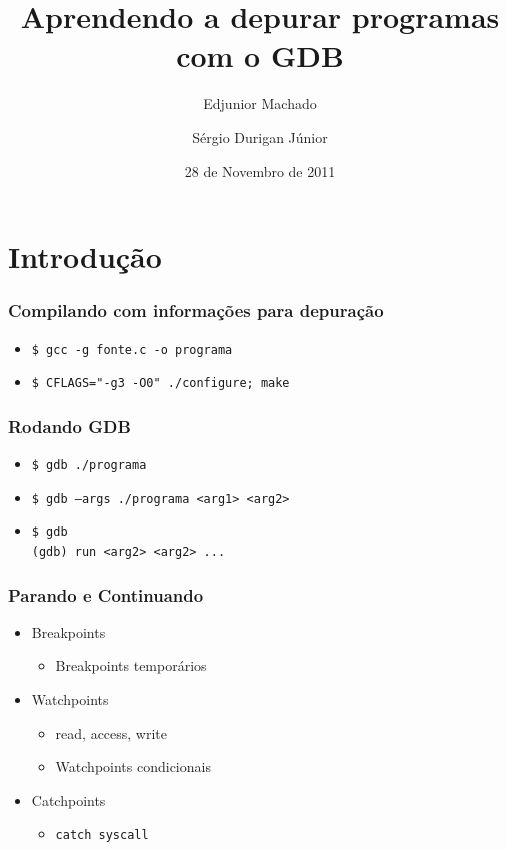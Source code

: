 \documentclass[xcolor=pdftex,dvipsnames,table,t]{beamer}
\title{Aprendendo a depurar programas com o GDB}
\author{Edjunior Machado \and
	Sérgio Durigan Júnior}
\date[Unicamp]{28 de Novembro de 2011}
\begin{document}

\section{Introdução}
\begin{frame}
	\frametitle{Compilando com informações para depuração}
	  \begin{itemize}
	    \item \texttt{\$ gcc -g fonte.c -o programa}
	    \item \texttt{\$ CFLAGS="-g3 -O0" ./configure; make}
	  \end{itemize}
\end{frame}

\begin{frame}
	\frametitle{Rodando GDB}
	  \begin{itemize}
	    \item \texttt{\$ gdb ./programa}
	    \item \texttt{\$ gdb --args ./programa <arg1> <arg2>}
	    \item \texttt{\$ gdb \\
		(gdb) run <arg2> <arg2> ...}
	  \end{itemize}
\end{frame}

\begin{frame}
	\frametitle{Parando e Continuando} %
	  \begin{itemize}
	    \item Breakpoints
	      \begin{itemize}
		\item Breakpoints temporários
	      \end{itemize}
	    \item Watchpoints
	      \begin{itemize}
		\item read, access, write
		\item Watchpoints condicionais
	      \end{itemize}
	    \item Catchpoints
	      \begin{itemize}
		\item \texttt{catch syscall}
	      \end{itemize}
	  \end{itemize}
\end{frame}
\end{document}
